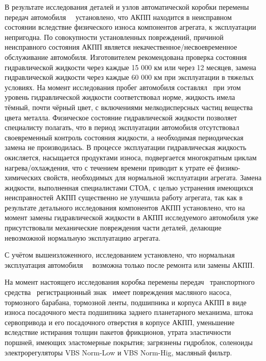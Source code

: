   В результате исследования деталей и узлов автоматической коробки перемены передач  автомобиля  \, \, установлено, что АКПП находится в неисправном состоянии вследствие физического износа компонентов агрегата, к эксплуатации непригодна. По совокупности установленных повреждений, причиной неисправного состояния АКПП является некачественное/несвоевременное обслуживание автомобиля.  Изготовителем рекомендована проверка состояния гидравлической жидкости через каждые 15 000 км или через 12 месяцев, замена гидравлической жидкости через каждые 60 000 км при эксплуатации в тяжелых условиях. На момент исследования пробег автомобиля составлял \, при этом уровень гидравлической жидкости соответствовал норме, жидкость имела тёмный, почти чёрный цвет, с включениями мелкодисперсных частиц вещества цвета металла. Физическое состояние гидравлической жидкости позволяет специалисту полагать, что в период эксплуатации автомобиля отсутствовал своевременный контроль состояния жидкости, а необходимая периодическая замена не производилась.
  В процессе эксплуатации гидравлическая жидкость окисляется, насыщается  продуктами износа, подвергается многократным циклам нагрева/охлаждения, что с течением времени приводит к утрате её физико-химических свойств, необходимых для нормальной эксплуатации агрегата.  
   Замена жидкости, выполненная специалистами СТОА, с целью устранения имеющихся неисправностей АКПП существенно не улучшила  работу агрегата, так как в результате  детального исследования компонентов АКПП установлено, что на момент замены гидравлической жидкости  в АКПП исследуемого автомобиля  уже присутствовали  механические повреждения части деталей, делающие невозможной нормальную эксплуатацию агрегата.
  
  С учётом вышеизложенного, исследованием установлено, что нормальная эксплуатация автомобиля \, \, возможна только после ремонта или замены АКПП.



На момент настоящего исследования  коробка перемены передач \, транспортного средства \, регистрационный знак \,
имеет повреждения  масляного насоса, тормозного барабана, тормозной ленты, подшипника и корпуса АКПП в виде износа посадочного места подшипника заднего планетарного механизма,  штока сервопривода и его посадочного отверстия в корпусе АКПП, уменьшение вследствие истирания толщин пакетов фрикционов, утрата эластичности поршней, имеющих эластомерные покрытия; загрязнены гидроблок, соленоиды электрорегуляторы VBS Norm-Low  и VBS Norm-Hig, масляный фильтр.

